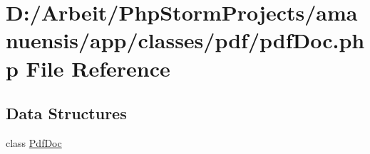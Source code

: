 \hypertarget{pdf_doc_8php}{}\section{D\+:/\+Arbeit/\+Php\+Storm\+Projects/amanuensis/app/classes/pdf/pdf\+Doc.php File Reference}
\label{pdf_doc_8php}
\subsection*{Data Structures}
\begin{DoxyCompactItemize}
\item 
class \hyperlink{class_pdf_doc}{Pdf\+Doc}
\end{DoxyCompactItemize}
